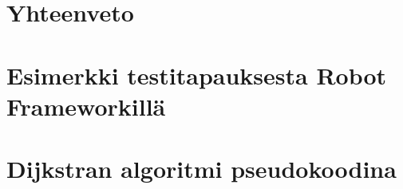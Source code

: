 \documentclass[finnish, authoryear]{config/tauthesis}
\theoremstyle{definition}
\begin{document}
\chapter{Yhteenveto} \label{ch:11_yhteenveto}
  
\printbibliography[heading=bibintoc]

\begin{appendices}
\chapter{Esimerkki testitapauksesta Robot Frameworkillä} \label{ch:12_liite_robot_testitapaus}
  
\chapter{Dijkstran algoritmi pseudokoodina} \label{ch:13_liite_dijkstran_algoritmi}
  
\end{appendices}
\end{document}
